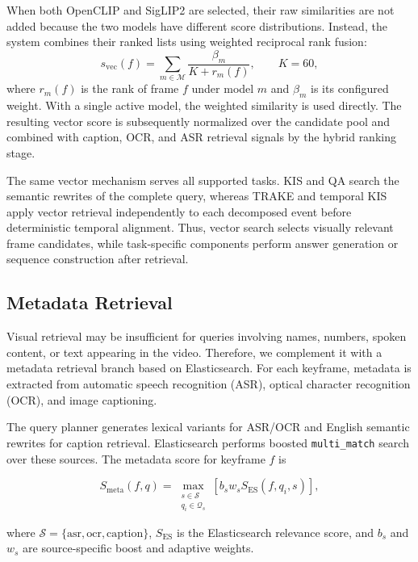 \documentclass[11pt]{article}
\begin{document}
When both OpenCLIP and SigLIP2 are selected, their raw similarities
are not added because the two models have different score
distributions. Instead, the system combines their ranked lists using
weighted reciprocal rank fusion:
\begin{equation}
    s_{\mathrm{vec}}(f)=
    \sum_{m\in\mathcal{M}}
    \frac{\beta_m}{K+r_m(f)},
    \qquad K=60,
\end{equation}
where $r_m(f)$ is the rank of frame $f$ under model $m$ and
$\beta_m$ is its configured weight. With a single active model, the
weighted similarity is used directly. The resulting vector score is
subsequently normalized over the candidate pool and combined with
caption, OCR, and ASR retrieval signals by the hybrid ranking stage.

The same vector mechanism serves all supported tasks. KIS and QA
search the semantic rewrites of the complete query, whereas TRAKE and
temporal KIS apply vector retrieval independently to each decomposed
event before deterministic temporal alignment. Thus, vector search
selects visually relevant frame candidates, while task-specific
components perform answer generation or sequence construction after
retrieval.

\subsection{Metadata Retrieval}
\label{sec:metadata-retrieval}

Visual retrieval may be insufficient for queries involving names, numbers,
spoken content, or text appearing in the video. Therefore, we complement it
with a metadata retrieval branch based on Elasticsearch. For each keyframe,
metadata is extracted from automatic speech recognition (ASR), optical
character recognition (OCR), and image captioning.

The query planner generates lexical variants for ASR/OCR and English semantic
rewrites for caption retrieval. Elasticsearch performs boosted
\texttt{multi\_match} search over these sources. The metadata score for
keyframe $f$ is

\[
S_{\mathrm{meta}}(f,q)
=
\max_{\substack{s \in \mathcal{S} \\ q_i \in \mathcal{Q}_s}}
\left[
b_s w_s S_{\mathrm{ES}}(f,q_i,s)
\right],
\]

where
$\mathcal{S}=\{\mathrm{asr},\mathrm{ocr},\mathrm{caption}\}$,
$S_{\mathrm{ES}}$ is the Elasticsearch relevance score, and $b_s$ and $w_s$
are source-specific boost and adaptive weights.
\end{document}
